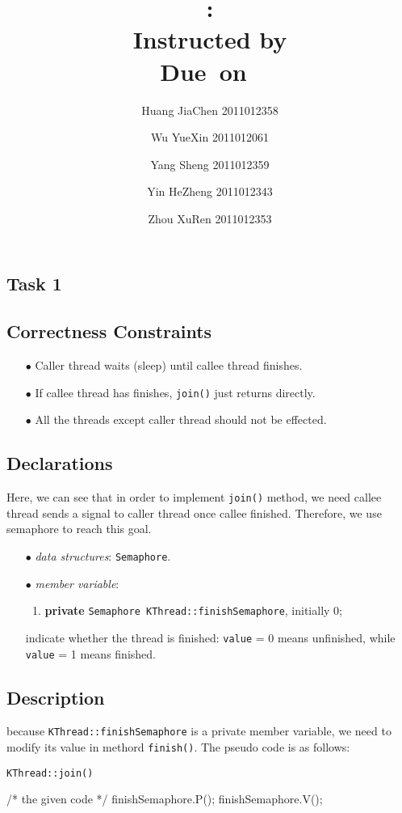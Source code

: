\documentclass{article}
\title{\textmd{\bf \Class: \Title}\\{\large Instructed by \textit{\ClassInstructor}}\\\normalsize\vspace{0.1in}\small{Due\ on\ \DueDate}}
\date{}
\author{%
  Huang JiaChen 2011012358 \and
  Wu YueXin 2011012061 \and
  Yang Sheng 2011012359 \and
  Yin HeZheng 2011012343 \and
  Zhou XuRen 2011012353}
\begin{document}
  \begin{spacing}{1.1}
    \maketitle \thispagestyle{empty}


\theoremstyle{plain} \newtheorem{computational}{Definition}
    \section{Task 1}

\subsection{Correctness Constraints}
\begin{enumerate}
  \item[$\bullet$] Caller thread waits (sleep) until callee thread finishes.
  \item[$\bullet$] If callee thread has finishes, \texttt{join()} just returns
    directly.
  \item[$\bullet$] All the threads except caller thread should not be effected. 
\end{enumerate}

\subsection{Declarations}
Here, we can see that in order to implement \texttt{join()} method, we need callee
thread sends a signal to caller thread once callee finished. Therefore, we use
semaphore to reach this goal. 
\begin{enumerate}
  \item[$\bullet$] \textit{data structures}: \texttt{Semaphore}.
  \item[$\bullet$] \textit{member variable}:
    \begin{enumerate}
  \item \textbf{private} \texttt{Semaphore KThread::finishSemaphore}, initially 0;
\end{enumerate}
indicate whether the thread is finished: \texttt{value} = 0 means unfinished, while
\texttt{value} = 1 means finished.

\end{enumerate}

\subsection{Description}
because \texttt{KThread::finishSemaphore} is a private
member variable, we need to modify its value in methord \texttt{finish()}.
The pseudo code is as follows:
\begin{algorithm}[htbp]
  \caption{\texttt{KThread::join()}}
  \begin{algorithmic}[1]
    \STATE /* the given code */
    \STATE finishSemaphore.P();
    \STATE finishSemaphore.V();
  \end{algorithmic}
\end{algorithm}


\end{spacing}
\end{document}
